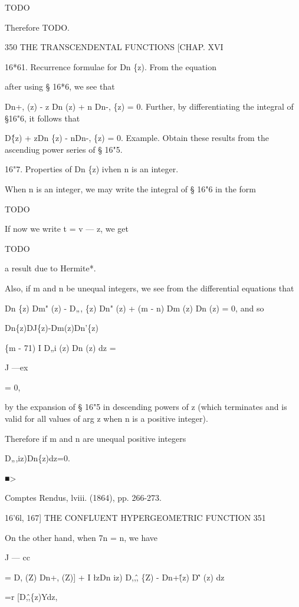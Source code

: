 TODO

Therefore TODO.



350 THE TRANSCENDENTAL FUNCTIONS [CHAP. XVI 

16*61. Recurrence formulae for Dn \{z). 
From the equation 

after using § 16*6, we see that 

Dn+, (z) - z Dn (z) + n Dn-, \{z) = 0. 
Further, by differentiating the integral of §16"6, it follows that 

D\^ \{z) + zDn \{z) - nDn-, \{z) = 0. 
Example. Obtain these results from the ascendiug power series of § 16"5. 

16"7. Properties of Dn \{z) ivhen n is an integer. 

When n is an integer, we may write the integral of § 16"6 in the form 

TODO

If now we write t = v — z, we get 

TODO

a result due to Hermite*. 

Also, if m and n be unequal integers, we see from the differential 
equations that 

Dn \{z) Dm" (z) - D„, \{z) Dn" (z) + (m - n) Dm (z) Dn (z) = 0, 
and so 



Dn\{z)DJ\{z)-Dm(z)Dn'\{z) 



\{m - 71) I D„i (z) Dn (z) dz = 

J —ex 

= 0, 

by the expansion of § 16"5 in descending powers of z (which terminates 
and is valid for all values of arg z when n is a positive integer). 

Therefore if m and n are unequal positive integers 

D„,iz)Dn\{z)dz=0. 

■> 

Comptes Rendus, lviii. (1864), pp. 266-273. 



16'6l, 167] THE CONFLUENT HYPERGEOMETRIC FUNCTION 351 

On the other hand, when 7n = n, we have 

J — cc 

= D, (Z) Dn+, (Z)] + I \l zDn iz) D,,\^, \{Z) - Dn+\^ (z) D\^' (z) dz 

=r [D,\^,\{z)Ydz, 


